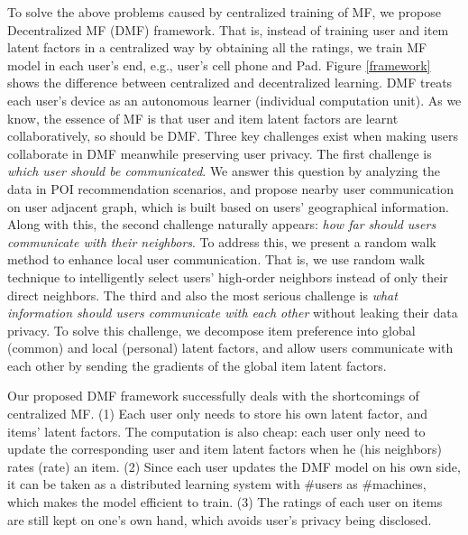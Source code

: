 To solve the above problems caused by centralized training of MF, we propose Decentralized MF (DMF) framework. 
That is, instead of training user and item latent factors in a centralized way by obtaining all the ratings, we train MF model in each user's end, e.g., user's cell phone and Pad.  
Figure \ref{framework} shows the difference between centralized and decentralized learning. 
DMF treats each user's device as an autonomous learner (individual computation unit). 
As we know, the essence of MF is that user and item latent factors are learnt collaboratively, so should be DMF. 
Three key challenges exist when making users collaborate in DMF meanwhile preserving user privacy. 
The first challenge is \textit{which user should be communicated}. 
We answer this question by analyzing the data in POI recommendation scenarios, and propose nearby user communication on user adjacent graph, which is built based on users' geographical information. 
Along with this, the second challenge naturally appears: \textit{how far should users communicate with their neighbors}. 
To address this, we present a random walk method to enhance local user communication. 
That is, we use random walk technique to intelligently select users' high-order neighbors instead of only their direct neighbors. 
The third and also the most serious challenge is \textit{what information should users communicate with each other} without leaking their data privacy. 
To solve this challenge, we decompose item preference into global (common) and local (personal) latent factors, and allow users communicate with each other by sending the gradients of the global item latent factors. 

Our proposed DMF framework successfully deals with the shortcomings of centralized MF.  
(1) Each user only needs to store his own latent factor, and items' latent factors. 
The computation is also cheap: each user only need to update the corresponding user and item latent factors when he (his neighbors) rates (rate) an item. 
(2) Since each user updates the DMF model on his own side, it can be taken as a distributed learning system with \#users as \#machines, which makes the model efficient to train. 
(3) The ratings of each user on items are still kept on one's own hand, which avoids user's privacy being disclosed. 


